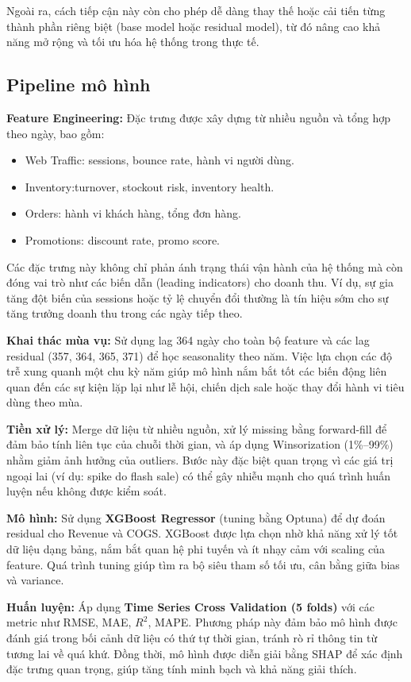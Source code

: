 \documentclass{article}
\begin{document}
Ngoài ra, cách tiếp cận này còn cho phép dễ dàng thay thế hoặc cải tiến từng thành phần riêng biệt (base model hoặc residual model), từ đó nâng cao khả năng mở rộng và tối ưu hóa hệ thống trong thực tế.

\subsection{Pipeline mô hình}

\textbf{Feature Engineering:} Đặc trưng được xây dựng từ nhiều nguồn và tổng hợp theo ngày, bao gồm:
\begin{itemize}
    \item Web Traffic: sessions, bounce rate, hành vi người dùng.
    \item Inventory:turnover, stockout risk, inventory health.
    \item Orders: hành vi khách hàng, tổng đơn hàng.
    \item Promotions: discount rate, promo score.
\end{itemize}

Các đặc trưng này không chỉ phản ánh trạng thái vận hành của hệ thống mà còn đóng vai trò như các biến dẫn (leading indicators) cho doanh thu. Ví dụ, sự gia tăng đột biến của sessions hoặc tỷ lệ chuyển đổi thường là tín hiệu sớm cho sự tăng trưởng doanh thu trong các ngày tiếp theo.

\textbf{Khai thác mùa vụ:} Sử dụng lag 364 ngày cho toàn bộ feature và các lag residual (357, 364, 365, 371) để học seasonality theo năm. Việc lựa chọn các độ trễ xung quanh một chu kỳ năm giúp mô hình nắm bắt tốt các biến động liên quan đến các sự kiện lặp lại như lễ hội, chiến dịch sale hoặc thay đổi hành vi tiêu dùng theo mùa.

\textbf{Tiền xử lý:} Merge dữ liệu từ nhiều nguồn, xử lý missing bằng forward-fill để đảm bảo tính liên tục của chuỗi thời gian, và áp dụng Winsorization (1\%–99\%) nhằm giảm ảnh hưởng của outliers. Bước này đặc biệt quan trọng vì các giá trị ngoại lai (ví dụ: spike do flash sale) có thể gây nhiễu mạnh cho quá trình huấn luyện nếu không được kiểm soát.

\textbf{Mô hình:} Sử dụng \textbf{XGBoost Regressor} (tuning bằng Optuna) để dự đoán residual cho Revenue và COGS. XGBoost được lựa chọn nhờ khả năng xử lý tốt dữ liệu dạng bảng, nắm bắt quan hệ phi tuyến và ít nhạy cảm với scaling của feature. Quá trình tuning giúp tìm ra bộ siêu tham số tối ưu, cân bằng giữa bias và variance.

\textbf{Huấn luyện:} Áp dụng \textbf{Time Series Cross Validation (5 folds)} với các metric như RMSE, MAE, $R^2$, MAPE. Phương pháp này đảm bảo mô hình được đánh giá trong bối cảnh dữ liệu có thứ tự thời gian, tránh rò rỉ thông tin từ tương lai về quá khứ. Đồng thời, mô hình được diễn giải bằng SHAP để xác định đặc trưng quan trọng, giúp tăng tính minh bạch và khả năng giải thích.
\end{document}
